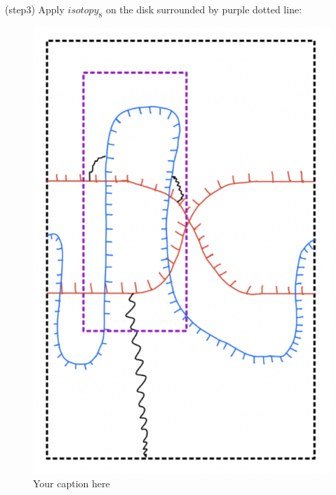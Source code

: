 (step3) Apply $isotopy_8$ on the disk surrounded by purple dotted line:
\begin{figure}[H] %
    \centering
    \includegraphics[scale=0.95]{diagrams/lemma9/7.png} %
    \caption{Your caption here}
    \label{fig:your-label}
\end{figure}

